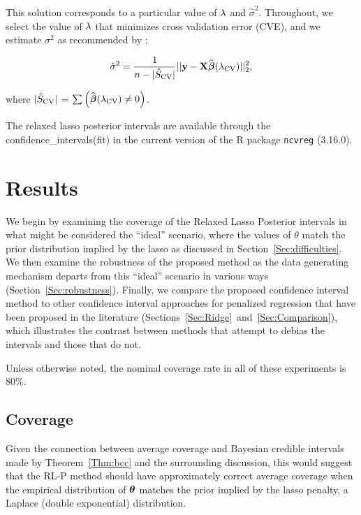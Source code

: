 This solution corresponds to a particular value of $\lambda$ and $\hat{\sigma}^2$. Throughout, we select the value of $\lambda$ that minimizes cross validation error (CVE), and we estimate $\sigma^2$ as recommended by \citep{Reid2016}:

$$
\hat{\sigma}^2 = \frac{1}{n - |\hat{S}_{\textrm{CV}}|} ||\mathbf{y} - \mathbf{X}\widehat{\boldsymbol{\beta}}({\lambda_{\textrm{CV}}})||_2^2,
$$

\noindent where $|\hat{S}_{\textrm{CV}}|$ = $\sum \left( \widehat{\boldsymbol{\beta}}({\lambda_{\textrm{CV}}}) \neq 0 \right)$.

The relaxed lasso posterior intervals are available through the confidence\_intervals(fit) in the current version of the R package \texttt{ncvreg} (3.16.0).

\section{Results}
\label{Sec:results}

We begin by examining the coverage of the Relaxed Lasso Posterior intervals in what might be considered the ``ideal'' scenario, where the values of $\theta$ match the prior distribution implied by the lasso as discussed in Section~\ref{Sec:difficulties}. We then examine the robustness of the proposed method as the data generating mechanism departs from this ``ideal'' scenario in various ways (Section~\ref{Sec:robustness}). Finally, we compare the proposed confidence interval method to other confidence interval approaches for penalized regression that have been proposed in the literature (Sections~\ref{Sec:Ridge}~and~\ref{Sec:Comparison}), which illustrates the contrast between methods that attempt to debias the intervals and those that do not.

Unless otherwise noted, the nominal coverage rate in all of these experiments is 80\%.

\subsection{Coverage}\label{Sec:coverage}

Given the connection between average coverage and Bayesian credible intervals made by Theorem~\ref{Thm:bcc} and the surrounding discussion, this would suggest that the RL-P method should have approximately correct average coverage when the empirical distribution of $\boldsymbol{\theta}$ matches the prior implied by the lasso penalty, a Laplace (double exponential) distribution.

